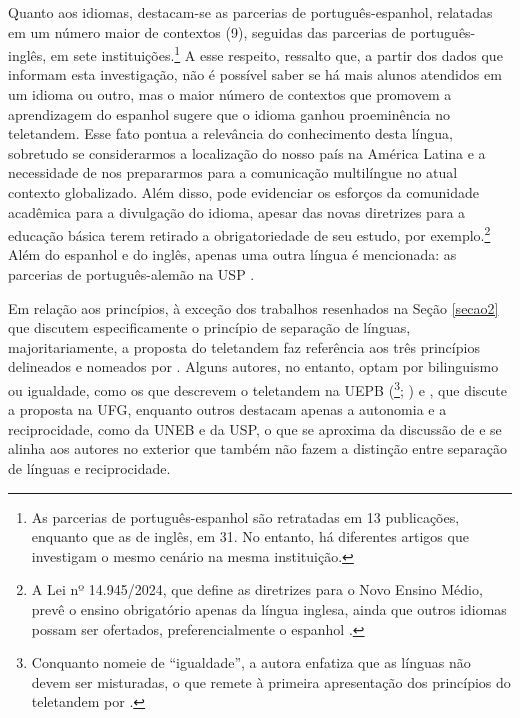 \documentclass[portuguese]{textolivre}
\begin{document}
Quanto aos idiomas, destacam-se as parcerias de português-espanhol, relatadas em um número maior de contextos (9), seguidas das parcerias de portu\-guês-inglês, em sete instituições.\footnote{As parcerias de português-espanhol são retratadas em 13 publicações, enquanto que as de inglês, em 31. No entanto, há diferentes artigos que investigam o mesmo cenário na mesma instituição.} A esse respeito, ressalto que, a partir dos dados que informam esta investigação, não é possível saber se há mais alunos atendidos em um idioma ou outro, mas o maior número de contextos que promovem a aprendizagem do espanhol sugere que o idioma ganhou proeminência no teletandem. Esse fato pontua a relevância do conhecimento desta língua, sobretudo se considerarmos a localização do nosso país na América Latina e a necessidade de nos prepararmos para a comunicação multilíngue no atual contexto globalizado. Além disso, pode evidenciar os esforços da comunidade acadêmica para a divulgação do idioma, apesar das novas diretrizes para a educação básica terem retirado a obrigatoriedade de seu estudo, por exemplo.\footnote{A Lei nº 14.945/2024, que define as diretrizes para o Novo Ensino Médio, prevê o ensino obrigatório apenas da língua inglesa, ainda que outros idiomas possam ser ofertados, preferencialmente o espanhol \cite{brasil2024}.} Além do espanhol e do inglês, apenas uma outra língua é mencionada: as parcerias de português-alemão na USP \cite{aquino2022}.

Em relação aos princípios, à exceção dos trabalhos resenhados na Seção \ref{secao2} que discutem especificamente o princípio de separação de línguas, majoritariamente, a proposta do teletandem faz referência aos três princípios delineados e nomeados por \textcite{vassallo2006}. Alguns autores, no entanto, optam por bilinguismo ou igualdade, como os que descrevem o teletandem na UEPB (\textcite{maciel2024}\footnote{Conquanto nomeie de “igualdade”, a autora enfatiza que as línguas não devem ser misturadas, o que remete à primeira apresentação dos princípios do teletandem por \textcite{vassallo2006}.}; \textcite{silva2022, silva2022b}) e \textcite{figueiredo2024}, que discute a proposta na UFG, enquanto outros destacam apenas a autonomia e a reciprocidade, como \textcite{pereira2023} da UNEB e \textcite{aquino2022} da USP, o que se aproxima da discussão de \textcite{brammerts1996} e se alinha aos autores no exterior que também não fazem a distinção entre separação de línguas e reciprocidade.
\end{document}
